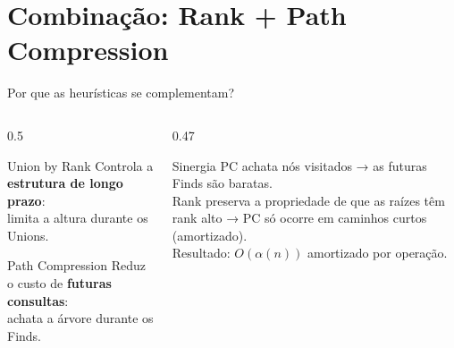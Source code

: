 \documentclass[aspectratio=169]{beamer}
\begin{document}
\section{Combinação: Rank + Path Compression}

\begin{frame}{Por que as heurísticas se complementam?}%
  \begin{columns}[T]
    \begin{column}{0.5\textwidth}
      \begin{block}{Union by Rank}
        Controla a \textbf{estrutura de longo prazo}:\\
        limita a altura durante os Unions.
      \end{block}
      \vspace{0.3cm}
      \begin{block}{Path Compression}
        Reduz o custo de \textbf{futuras consultas}:\\
        achata a árvore durante os Finds.
      \end{block}
    \end{column}
    \begin{column}{0.47\textwidth}
      \begin{exampleblock}{Sinergia}
        PC achata nós visitados → as futuras Finds são baratas.\\[6pt]
        Rank preserva a propriedade de que as raízes têm rank alto → PC só ocorre em caminhos curtos (amortizado).\\[6pt]
        Resultado: $O(\alpha(n))$ amortizado por operação.
      \end{exampleblock}
    \end{column}
  \end{columns}
\end{frame}
\end{document}

